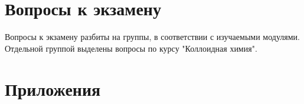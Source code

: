 \documentclass[12pt,a4paper]{report}
\begin{document}
\chapter{Вопросы к  экзамену}
Вопросы к экзамену разбиты на группы, в соответствии с изучаемыми модулями. Отдельной группой выделены вопросы по курсу "Коллоидная химия".

\newpage

\newpage
\chapter{Приложения}


\newpage

\newpage

\end{document}
